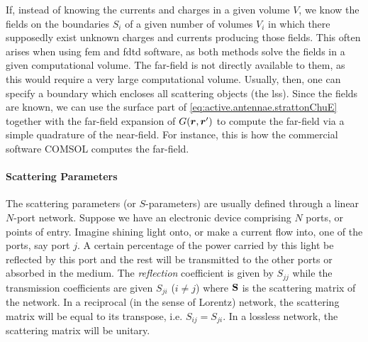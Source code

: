 		\begin{exmp}\label{ex:active.antennae.nearToFarTrans}
			If, instead of knowing the currents and charges in a given volume $V$, we know the 
			fields on the boundaries $S_i$ of a given number of volumes $V_i$ in which there supposedly exist
			unknown charges and currents producing those fields. This often arises when using \gls{fem}
			and \gls{fdtd} software, as both methods solve the fields in a given computational volume. The
			far-field is not directly available to them, as this would require a very large computational volume.
			Usually, then, one can specify a boundary which encloses all scattering objects (the \gls{lss}). 
			Since the fields are known, we can use the surface part of \eqref{eq:active.antennae.strattonChuE}
			together with the far-field expansion of $G(\boldsymbol{r},\boldsymbol{r}')$ to compute the far-field via a simple
			quadrature of the near-field. For instance, this is how the commercial software COMSOL computes the
			far-field.
		\end{exmp}
	

\paragraph{Scattering Parameters}
The scattering parameters (or $S$-parameters) are
usually defined through a linear $N$-port network. 
Suppose we have an electronic device comprising
$N$ ports, or points of entry. Imagine shining light onto, 
or make a current flow into,
one of the ports, say port $j$. A certain percentage
of the power carried by this light be reflected 
by this port and the rest will be transmitted to the
other ports or absorbed in the medium. The \textit{reflection}
coefficient is given by $S_{jj}$ while the transmission
coefficients are given $S_{ji}$ ($i\neq j$) where $\mathbf{S}$
is the scattering matrix of the network. In a reciprocal (in the sense
of Lorentz) network, the scattering matrix will be equal to its
transpose, i.e. $S_{ij}=S_{ji}$. In a lossless network, the scattering
matrix will be unitary. 

